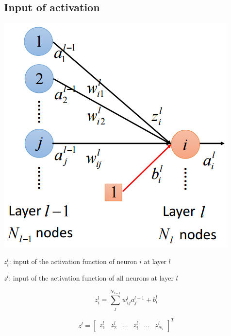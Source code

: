 \documentclass{article}
\begin{document}
\subsection{Input of activation}
\begin{center}
\includegraphics[scale=0.4]{activation_input}
\end{center}
$z^l_i$: input of the activation function of neuron $i$ at layer $l$

$z^l$: input of the activation function of all neurons at layer $l$

\[
z^l_i = \sum_j^{N_{l-1}} w^l_{ij}a^{l-1}_j + b^l_i
\]

\[
z^l = 
\begin{bmatrix}
    z^l_{1} & z^l_{2} & \dots & z^l_{i} & \dots  & z^l_{N_l}
\end{bmatrix}^T
\]
\end{document}
